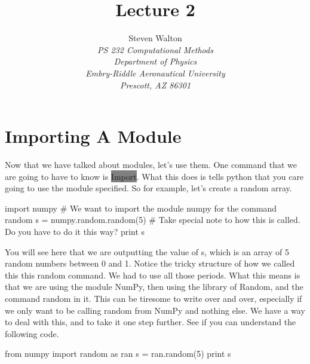 \documentclass[11pt]{article}   %
\title{Lecture 2}
\author{Steven Walton\\     %
\textit{PS 232 Computational Methods}\\
\textit{Department of Physics}\\
\textit{Embry-Riddle Aeronautical University}\\
\textit{Prescott, AZ   86301}}
\newcommand{\gray}[1]{\colorbox{gray}{#1}}
\begin{document}
\maketitle

\section*{Importing A Module}
Now that we have talked about modules, let's use them. One command that we are going to have to know is \gray{Import}.
What this does is tells python that you care going to use the module specified.  So for example, let's create a random array.
\begin{tcolorbox}
   import numpy                  $\#$ We want to import the module numpy for the command random
   s = numpy.random.random(5)    $\#$ Take special note to how this is called.  Do you have to do it this way?
   print s
\end{tcolorbox}


You will see here that we are outputting the value of s, which is an array of 5 random numbers between 0 and 1.
Notice the tricky structure of how we called this this random command.  We had to use all those periods.  What this means
is that we are using the module NumPy, then using the library of Random, and the command random in it. This can be
tiresome to write over and over, especially if we only want to be calling random from NumPy and nothing else.  We have
a way to deal with this, and to take it one step further.  See if you can understand the following code.
\begin{tcolorbox}
   from numpy import random as ran
   s = ran.random(5)
   print s
\end{tcolorbox}
\end{document}

